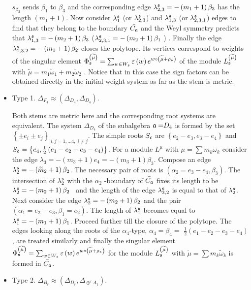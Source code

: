 \documentclass[12pt]{article}
\begin{document}
\begin{itemize}
$s_{\beta
_{2}} $ sends $\beta _{1}$ to $\beta _{3}$ and the corresponding edge 
$\lambda _{2,3}^{\frak{s}}=-\left( m_{1}+1\right) \beta _{3}$ has
the length $\left( m_{1}+1\right) $. Now consider $\lambda _{1}^{\frak{s}}$ (or
$\lambda _{2,3}^{\frak{s}} $) and $\lambda _{1,3}^{\frak{s}}$ (or
$\lambda _{2,3,1}^{\frak{s}}$) edges to find that they belong to
the boundary $\bar{C_{\frak{a}}}$ and the Weyl symmetry predicts
that $\lambda _{1,3}^{\frak{s}}=-\left( m_{2}+1\right)
\beta _{3}$ ($\lambda _{2,3,1}^{\frak{s}}=-\left( m_{2}+1\right) \beta _{1}$%
) . Finally the edge $\lambda _{1,3,2}^{\frak{s}}=-\left(
m_{1}+1\right) \beta _{2}$ closes the polytope. Its vertices
correspond to weights of the singular
element $\Phi _{\frak{s}}^{\left( \widetilde{\mu }\right) }=\sum_{w\in W_{%
\frak{s}}}\varepsilon \left( w\right) e^{w\circ \left(
\widetilde{\mu }+\rho
_{\frak{s}}\right) }$ of the module $L_{\frak{s}}^{\left( \widetilde{\mu }%
\right) }$ with $\widetilde{\mu }=m_{1}\widetilde{\omega }_{1}+m_{2}%
\widetilde{\omega }_{2}$ . Notice that in this case the sign
factors can be obtained directly in the initial weight system as
far as the stem is metric.
\item
Type 1. $\Delta _{F_{4}}\approx (\Delta _{D_{4}},\Delta
_{D_{4}}).$

Both stems are metric here and the corresponding root systems are
equivalent. The system $\Delta _{D_{4}}$ of the subalgebra
$\frak{a=}D_{4}$ is formed by the set $\left\{ \pm e_{i}\pm
e_{j}\right\} _{|i,j=1,\ldots 4,\; i\neq j}.$ The simple roots
$S_{\frak{c}}$ are $\left\{ e_{2}-e_{3},e_{3}-e_{4}\right\} $ and
$S_{\frak{d}}=\left\{ e_{4},\frac{1}{2}\left(
e_{1}-e_{2}-e_{3}-e_{4}\right) \right\} $.
For a module $L^{\mu }$ with $\mu =\sum m_{k}\omega _{k}$ consider the edge $%
\lambda _{3}=-\left( m_{3}+1\right) e_{4}=-\left( m_{3}+1\right)
\beta _{3}$.
 Compose an edge $\lambda _{2}^{\frak{s}}=-\left( \widetilde{m}%
_{2}+1\right) \beta _{2}$. The necessary pair of roots is $\left(
\alpha
_{2}=e_{3}-e_{4},\beta _{3}\right) $. The intersection of $\lambda _{2}^{%
\frak{s}}$ with the $\alpha _{2}$ -boundary of
$\bar{C_{\frak{a}}}$ fixes
its length to be $\lambda _{2}^{\frak{s}}=-\left( m_{2}+1\right) \beta _{2}$%
\ and the length of the edge $\lambda _{3,2}^{\frak{s}}$ is equal
to that of
$\lambda _{2}^{\frak{s}}$. Next consider the edge $\lambda _{2}^{\frak{s}%
}=-\left( m_{2}+1\right) \beta _{2}$ and the pair $\left( \alpha
_{1}=e_{2}-e_{3},\beta _{1}=e_{2}\right) $. The length of  
$\lambda _{1}^{\frak{s}}$ becomes equal to $\lambda
_{1}^{\frak{s}}=-\left( m_{1}+1\right) \beta _{1}$. Proceed further till the closure of the polytope. 
The edges looking along the roots of the $\alpha_4$-type, $\alpha _{4}=\beta
_{4}=$ $\frac{1}{2}\left( e_{1}-e_{2}-e_{3}-e_{4}\right) $, are
treated similarly and finally the singular element $\Phi
_{\frak{s}}^{\left( \widetilde{\mu }\right) }=\sum_{w\in
W_{\frak{s}}}\varepsilon \left( w\right) e^{w\circ \left(
\widetilde{\mu }+\rho _{\frak{s}}\right) }$ for the module
$L_{\frak{s}}^{\left( \widetilde{\mu }\right) }$ with
$\widetilde{\mu }=\sum m_{k}\widetilde{\omega }_{k}$ is formed in
$\bar{C_{\frak{a}}}$.
\item
Type 2. $\Delta _{B_{r}}\approx (\Delta _{D_{r}},\Delta _{\oplus
^{r}A_{1}}). $


\end{itemize}
\end{document}

